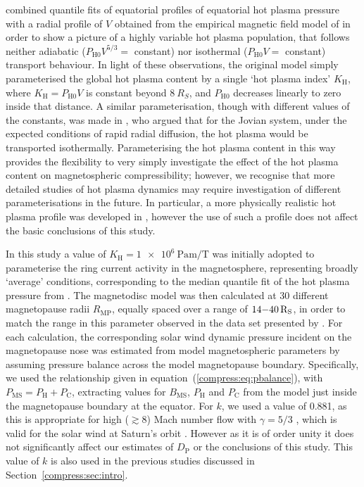 \citet{achilleos2010a} combined quantile fits of equatorial profiles of equatorial hot plasma pressure \citet{sergis2007} with a radial profile of $V$ obtained from the empirical magnetic field model of \citet{bunce2007} in order to show a picture of a highly variable hot plasma population, that follows neither adiabatic ($P_\mathrm{H0}V^{5/3} =$ constant) nor isothermal ($P_\mathrm{H0}V =$ constant) transport behaviour. In light of these observations, the original \citet{achilleos2010a} model simply parameterised the global hot plasma content by a single `hot plasma index' $K_\mathrm{H}$, where $ K_\mathrm{H}= P_\mathrm{H0}V$ is constant beyond $\SI{8}{R_S}$, and $P_\mathrm{H0}$ decreases linearly to zero inside that distance. A similar parameterisation, though with different values of the constants, was made in \citet{caudal1986}, who argued that for the Jovian system, under the expected conditions of rapid radial diffusion, the hot plasma would be transported isothermally. Parameterising the hot plasma content in this way provides the flexibility to very simply investigate the effect of the hot plasma content on magnetospheric compressibility; however, we recognise that more detailed studies of hot plasma dynamics may require investigation of different parameterisations in the future. In particular, a more physically realistic hot plasma profile was developed in \citet{achilleos2010b}, however the use of such a profile does not affect the basic conclusions of this study.

In this study a value of $K_\mathrm{H}=\SI{1e6}{\pascal \meter \per \tesla}$ was initially adopted to parameterise the ring current activity in the magnetosphere, representing broadly `average' conditions, corresponding to the median quantile fit of the hot plasma pressure from \citet{sergis2007}. The magnetodisc model was then calculated at 30 different magnetopause radii $R_\mathrm{MP}$, equally spaced over a range of $14{\--}\SI{40}{R_S}$, in order to match the range in this parameter observed in the data set presented by \citet{pilkington2015}. For each calculation, the corresponding solar wind dynamic pressure incident on the magnetopause nose was estimated from model magnetospheric parameters by assuming pressure balance across the model magnetopause boundary. Specifically, we used the relationship given in equation~(\ref{compress:eq:pbalance}), with $P_{\mathrm{MS}}=P_\mathrm{H}+P_\mathrm{C}$, extracting values for $B_\mathrm{MS}$, $P_\mathrm{H}$ and $P_\mathrm{C}$ from the model just inside the magnetopause boundary at the equator. For $k$, we used a value of 0.881, as this is appropriate for high ($\gtrsim 8$) Mach number flow with $\gamma = 5/3$ \citep{spreiter1966}, which is valid for the solar wind at Saturn's orbit \cite[e.g.][]{slavin1985,achilleos2006}. However as it is of order unity it does not significantly affect our estimates of $D_\mathrm{P}$ or the conclusions of this study. This value of $k$ is also used in the previous studies discussed in Section~\ref{compress:sec:intro}.


